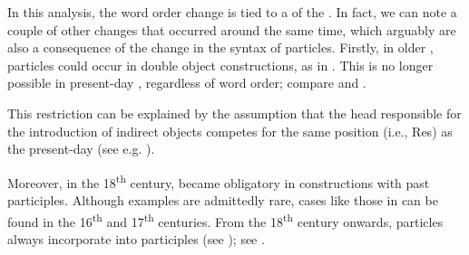 \documentclass[output=paper]{langscibook}
\begin{document}
In this analysis, the word order change is tied to a  of the . In fact, we can note a couple of other changes that occurred around the same time, which arguably are also a consequence of the change in the syntax of particles. Firstly, in older ,  particles could occur in double object constructions, as in . This is no longer possible in present-day , regardless of word order; compare  and .


\ea\label{ex:lalu:58}

\z
\ex\label{ex:lalu:59}

\z
\ex\label{ex:lalu:60}
\z
\z


This restriction can be explained by the assumption that the head responsible for the introduction of indirect objects competes for the same position (i.e., Res) as the present-day   (see e.g. \citealt{Ramchand2008}).



Moreover, in the 18\textsuperscript{th} century,   became obligatory in constructions with past participles. Although examples are admittedly rare, cases like those in  can be found in the 16\textsuperscript{th} and 17\textsuperscript{th} centuries. From the 18\textsuperscript{th} century onwards, particles always incorporate into participles (see \citealt{Lundquist2014Passives}); see .
\end{document}
